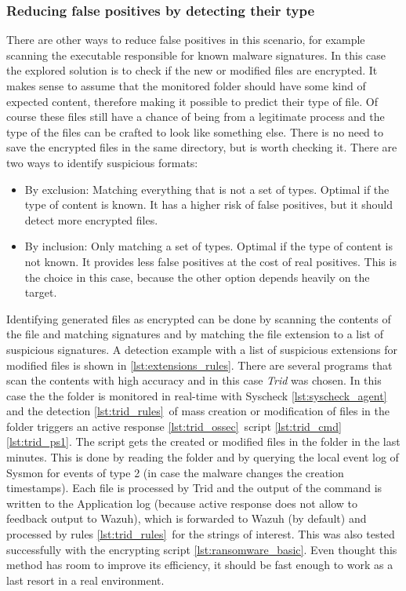 \subsubsection{Reducing false positives by detecting their type}
There are other ways to reduce false positives in this scenario, for example scanning the executable responsible for known malware signatures.
In this case the explored solution is to check if the new or modified files are encrypted.
\linej
It makes sense to assume that the monitored folder should have some kind of expected content, therefore making it possible to predict their type of file.
Of course these files still have a chance of being from a legitimate process and the type of the files can be crafted to look like something else.
There is no need to save the encrypted files in the same directory, but is worth checking it.
\linej
There are two ways to identify suspicious formats:
\begin{itemize}
	\item By exclusion: Matching everything that is not a set of types. Optimal if the type of content is known. It has a higher risk of false positives, but it should detect more encrypted files.
	\item By inclusion: Only matching a set of types. Optimal if the type of content is not known. It provides less false positives at the cost of real positives. This is the choice in this case, because the other option depends heavily on the target.
\end{itemize}
\linej
Identifying generated files as encrypted can be done by scanning the contents of the file and matching signatures and by matching the file extension to a list of suspicious signatures.
A detection example with a list of suspicious extensions\cite{crypto_ransomware_extensions} for modified files is shown in \ref{lst:extensions_rules}.
There are several programs that scan the contents with high accuracy and in this case \textit{Trid}\cite{trid} was chosen.
\linej
\linej
In this case the the folder is monitored in real-time with Syscheck \ref{lst:syscheck_agent} and the detection \ref{lst:trid_rules}\ of mass creation or modification of files in the folder triggers an active response \ref{lst:trid_ossec}\ script \ref{lst:trid_cmd}\ref{lst:trid_ps1}.
\linej
The script gets the created or modified files in the folder in the last minutes.
This is done by reading the folder and by querying the local event log of Sysmon for events of type 2 (in case the malware changes the creation timestamps).
\linej
Each file is processed by Trid and the output of the command is written to the Application log (because active response does not allow to feedback output to Wazuh), which is forwarded to Wazuh (by default) and processed by rules \ref{lst:trid_rules}\ for the strings of interest.
\linej
\linej
This was also tested successfully with the encrypting script \ref{lst:ransomware_basic}.
Even thought this method has room to improve its efficiency, it should be fast enough to work as a last resort in a real environment.

